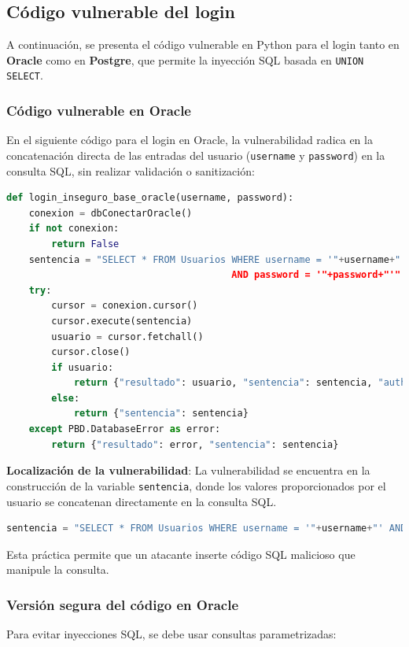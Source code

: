 \documentclass[a4paper,12pt]{article}
\begin{document}
\subsection{Código vulnerable del login}
A continuación, se presenta el código vulnerable en Python para el login  tanto en \textbf{Oracle} como en \textbf{Postgre}, que permite la inyección SQL basada en \texttt{UNION SELECT}.

\subsubsection{Código vulnerable en Oracle}
En el siguiente código para el login en Oracle, la vulnerabilidad radica en la concatenación directa de las entradas del usuario (\texttt{username} y \texttt{password}) en la consulta SQL, sin realizar validación o sanitización:

\begin{lstlisting}[language=Python]
def login_inseguro_base_oracle(username, password):
    conexion = dbConectarOracle()
    if not conexion:
        return False
    sentencia = "SELECT * FROM Usuarios WHERE username = '"+username+"'
                                        AND password = '"+password+"'"
    try:
        cursor = conexion.cursor()
        cursor.execute(sentencia)
        usuario = cursor.fetchall()
        cursor.close()
        if usuario:
            return {"resultado": usuario, "sentencia": sentencia, "auth": "true"}
        else:
            return {"sentencia": sentencia}
    except PBD.DatabaseError as error:
        return {"resultado": error, "sentencia": sentencia}
\end{lstlisting}

\textbf{Localización de la vulnerabilidad}: La vulnerabilidad se encuentra en la construcción de la variable \texttt{sentencia}, donde los valores proporcionados por el usuario se concatenan directamente en la consulta SQL.

\begin{lstlisting}[language=Python]
sentencia = "SELECT * FROM Usuarios WHERE username = '"+username+"' AND password = '"+password+"'"
\end{lstlisting}

Esta práctica permite que un atacante inserte código SQL malicioso que manipule la consulta.

\subsubsection{Versión segura del código en Oracle}
Para evitar inyecciones SQL, se debe usar consultas parametrizadas:
\end{document}
